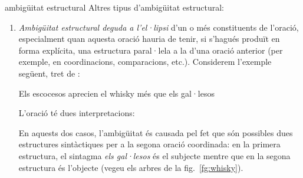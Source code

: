 \begin{persabermes}{ambigüitat estructural}
  Altres tipus d'ambigüitat estructural:
  \begin{enumerate}
  \item \emph{Ambigüitat estructural deguda a l'el·lipsi} d'un o més
    constituents de l'oració, especialment quan aquesta oració hauria
    de tenir, si s'hagués produït en forma explícita, una estructura
    paral·lela a la d'una oració anterior (per exemple, en
    coordinacions, comparacions, etc.).   Considerem l'exemple següent, tret de
    \citet[p.~399]{radford09b}:
    \begin{exemple}
      \label{eq:escocesos}
      Els escocesos aprecien el whisky més que els gal·lesos
    \end{exemple} L'oració té dues interpretacions:
    En aquests dos casos, l'ambigüitat és causada pel fet que són
    possibles dues estructures sintàctiques per a la segona oració
    coordinada: en la primera estructura, el sintagma \emph{els
      gal·lesos} és el subjecte mentre que en la segona estructura és
    l'objecte (vegeu els arbres de la fig.~\ref{fg:whisky}).


\end{enumerate}
\end{persabermes}
